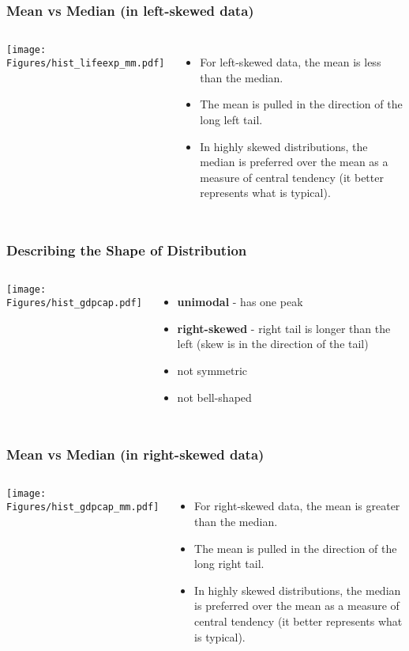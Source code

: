 \begin{frame}
\frametitle{Mean vs Median (in left-skewed data)}
\begin{columns}
\texttt{[image: Figures/hist\_lifeexp\_mm.pdf]}
\begin{itemize}
    \item
    For left-skewed data, the mean is less than the median.
    \item
    The mean is pulled in the direction of the long left tail.
    \item
    In highly skewed distributions, the median is preferred over the mean as a measure of central tendency (it better represents what is typical).
\end{itemize}
\end{columns}
\end{frame}


\begin{frame}
\frametitle{Describing the Shape of Distribution}
\begin{columns}
\texttt{[image: Figures/hist\_gdpcap.pdf]}
\begin{itemize}
    \item
    \textbf{unimodal} - has one peak
    \item
    \textbf{right-skewed} - right tail is longer than the left (skew is in the direction of the tail)
    \item
    not symmetric
    \item
    not bell-shaped
\end{itemize}
\end{columns}
\end{frame}

\begin{frame}
\frametitle{Mean vs Median (in right-skewed data)}
\begin{columns}
\texttt{[image: Figures/hist\_gdpcap\_mm.pdf]}
\begin{itemize}
    \item
    For right-skewed data, the mean is greater than the median.
    \item
    The mean is pulled in the direction of the long right tail.
    \item
    In highly skewed distributions, the median is preferred over the mean as a measure of central tendency (it better represents what is typical).
\end{itemize}
\end{columns}
\end{frame}

